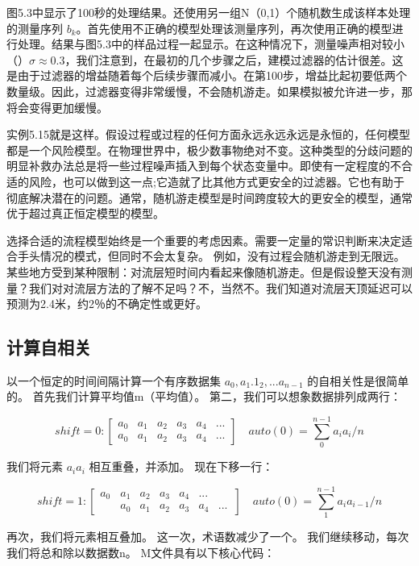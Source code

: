 图5.3中显示了100秒的处理结果。还使用另一组N（0,1）个随机数生成该样本处理的测量序列 $ b_{k} $。首先使用不正确的模型处理该测量序列，再次使用正确的模型进行处理。结果与图5.3中的样品过程一起显示。在这种情况下，测量噪声相对较小（）$ \sigma\approx 0.3 $，我们注意到，在最初的几个步骤之后，建模过滤器的估计很差。这是由于过滤器的增益随着每个后续步骤而减小。在第100步，增益比起初要低两个数量级。因此，过滤器变得非常缓慢，不会随机游走。如果模拟被允许进一步，那将会变得更加缓慢。


实例5.15就是这样。假设过程或过程的任何方面永远永远永远是永恒的，任何模型都是一个风险模型。在物理世界中，极少数事物绝对不变。这种类型的分歧问题的明显补救办法总是将一些过程噪声插入到每个状态变量中。即使有一定程度的不合适的风险，也可以做到这一点;它造就了比其他方式更安全的过滤器。它也有助于彻底解决潜在的问题。通常，随机游走模型是时间跨度较大的更安全的模型，通常优于超过真正恒定模型的模型。

选择合适的流程模型始终是一个重要的考虑因素。需要一定量的常识判断来决定适合手头情况的模式，但同时不会太复杂。
例如，没有过程会随机游走到无限远。某些地方受到某种限制：对流层短时间内看起来像随机游走。但是假设整天没有测量？我们对对流层方法的了解不足吗？不，当然不。我们知道对流层天顶延迟可以预测为2.4米，约2％的不确定性或更好。

\subsection{计算自相关}

以一个恒定的时间间隔计算一个有序数据集 $ a_{0},a_{1}.1_{2},...a_{n-1} $ 的自相关性是很简单的。 首先我们计算平均值m（平均值）。 第二，我们可以想象数据排列成两行：

\[ shift = 0:\begin{bmatrix}
a_{0}&a_{1}&a_{2}&a_{3}&a_{4}&...\\ a_{0}&a_{1}&a_{2}&a_{3}&a_{4}&...
\end{bmatrix}\quad auto(0)=\sum_{0}^{n-1}a_{i}a_{i}/n \] 


我们将元素  $ a_{i}a_{i} $  相互重叠，并添加。 现在下移一行：

 \[ shift = 1:\begin{bmatrix}
a_{0}&a_{1}&a_{2}&a_{3}&a_{4}&...&\quad\\ \quad&a_{0}&a_{1}&a_{2}&a_{3}&a_{4}&...
\end{bmatrix}\quad auto(0)=\sum_{1}^{n-1}a_{i}a_{i-1}/n \] 

再次，我们将元素相互叠加。 这一次，术语数减少了一个。 我们继续移动，每次我们将总和除以数据数n。 M文件具有以下核心代码：

